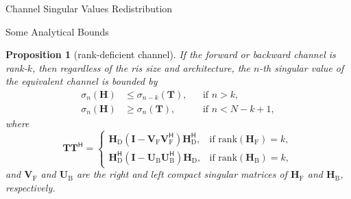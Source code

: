 \documentclass[journal]{IEEEtran}
\newtheorem{proposition}{Proposition}
\begin{document}
\begin{section}{Channel Singular Values Redistribution}
\begin{subsection}{Some Analytical Bounds}
		\begin{proposition}[rank-deficient channel]\label{pp:rank_deficient}
			If the forward or backward channel is rank-$k$, then regardless of the \gls{ris} size and architecture, the $n$-th singular value of the equivalent channel is bounded by
			\begin{align}
				\sigma_n(\mathbf{H}) & \le \sigma_{n-k}(\mathbf{T}), &  & \text{if } n > k, \label{iq:sv_bound_enlarge}          \\
				\sigma_n(\mathbf{H}) & \ge \sigma_n(\mathbf{T}),     &  & \text{if } n < N - k + 1, \label{iq:sv_bound_suppress}
			\end{align}
			where
			\begin{equation}
				\mathbf{T} \mathbf{T}^\mathsf{H} =
				\begin{cases}
					\mathbf{H}_\mathrm{D} (\mathbf{I} - \mathbf{V}_\mathrm{F} \mathbf{V}_\mathrm{F}^\mathsf{H}) \mathbf{H}_\mathrm{D}^\mathsf{H}, & \text{if } \mathrm{rank}(\mathbf{H}_\mathrm{F}) = k, \\
					\mathbf{H}_\mathrm{D}^\mathsf{H} (\mathbf{I} - \mathbf{U}_\mathrm{B} \mathbf{U}_\mathrm{B}^\mathsf{H}) \mathbf{H}_\mathrm{D}, & \text{if } \mathrm{rank}(\mathbf{H}_\mathrm{B}) = k,
				\end{cases}
				\label{eq:auxiliary_matrix}
			\end{equation}
			and $\mathbf{V}_\mathrm{F}$ and $\mathbf{U}_\mathrm{B}$ are the right and left compact singular matrices of $\mathbf{H}_\mathrm{F}$ and $\mathbf{H}_\mathrm{B}$, respectively.

\end{proposition}
\end{subsection}
\end{section}
\end{document}
